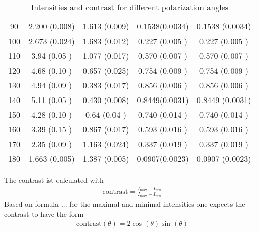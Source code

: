 \begin{table}[H]
\begin{tabular}{S S S S S}
		90                            & 2.200 (0.008)                 & 1.613 (0.009)                 & 0.1538(0.0034) & 0.1538 (0.0034) \\
		100                           & 2.673 (0.024)                 & 1.683 (0.012)                 & 0.227 (0.005 ) & 0.227 (0.005 )  \\
		110                           & 3.94  (0.05 )                 & 1.077 (0.017)                 & 0.570 (0.007 ) & 0.570 (0.007 )  \\
		120                           & 4.68  (0.10 )                 & 0.657 (0.025)                 & 0.754 (0.009 ) & 0.754 (0.009 )  \\
		130                           & 4.94  (0.09 )                 & 0.383 (0.017)                 & 0.856 (0.006 ) & 0.856 (0.006 )  \\
		140                           & 5.11  (0.05 )                 & 0.430 (0.008)                 & 0.8449(0.0031) & 0.8449 (0.0031) \\
		150                           & 4.28  (0.10 )                 & 0.64  (0.04 )                 & 0.740 (0.014 ) & 0.740 (0.014 )  \\
		160                           & 3.39  (0.15 )                 & 0.867 (0.017)                 & 0.593 (0.016 ) & 0.593 (0.016 )  \\
		170                           & 2.35  (0.09 )                 & 1.163 (0.024)                 & 0.337 (0.019 ) & 0.337 (0.019 )  \\
		180                           & 1.663 (0.005)                 & 1.387 (0.005)                 & 0.0907(0.0023) & 0.0907 (0.0023) \\
		\bottomrule
	\end{tabular}
	\caption{Intensities and contrast for different polarization angles}
\end{table}

The contrast ist calculated with
\begin{align}
	\text{contrast} = \frac{I_\text{max} -I_\text{min}}{I_\text{max}-I_\text{min}}
\end{align}
Based on formula ... for the maximal and minimal intensities one expects the
contrast to have the form
\begin{align}
	\text{contrast}(\theta) = 2\cos(\theta)\sin(\theta)
\end{align}

